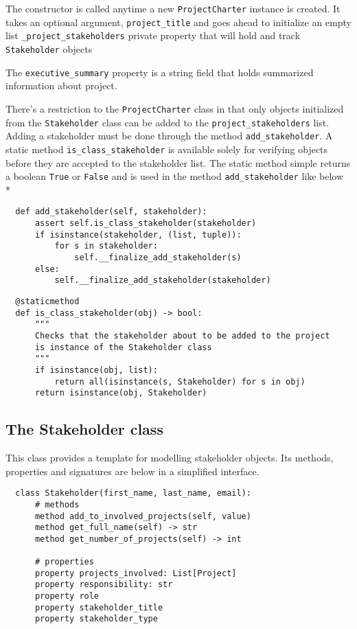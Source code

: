The constructor is called anytime a new \verb+ProjectCharter+ instance is created. It takes an optional argument, \verb+project_title+ and goes ahead to initialize an empty list \verb+_project_stakeholders+ private property that will hold and track \verb+Stakeholder+ objects

The \verb+executive_summary+ property is a string field that holds summarized information about project.

There's a restriction to the \verb+ProjectCharter+ class in that only objects initialized from the \verb+Stakeholder+ class can be added to the \verb+project_stakeholders+ list. \linebreak Adding a stakeholder must be done through the method \verb+add_stakeholder+. A static method \verb+is_class_stakeholder+ is available solely for verifying objects before they are accepted to the stakeholder list. The static method simple returns a boolean \verb+True+ or \verb+False+ and is used in the method \verb+add_stakeholder+ like below\\*

\begin{lstlisting}
  def add_stakeholder(self, stakeholder):
      assert self.is_class_stakeholder(stakeholder)
      if isinstance(stakeholder, (list, tuple)):
          for s in stakeholder:
              self.__finalize_add_stakeholder(s)
      else:
          self.__finalize_add_stakeholder(stakeholder)
\end{lstlisting}

\vfill

\begin{lstlisting}
  @staticmethod
  def is_class_stakeholder(obj) -> bool:
      """
      Checks that the stakeholder about to be added to the project
      is instance of the Stakeholder class
      """
      if isinstance(obj, list):
          return all(isinstance(s, Stakeholder) for s in obj)
      return isinstance(obj, Stakeholder)
\end{lstlisting}


\subsection{The Stakeholder class}
This class provides a template for modelling stakeholder objects. Its methods, properties and signatures are below in a simplified interface.

\begin{lstlisting}
  class Stakeholder(first_name, last_name, email):
      # methods
      method add_to_involved_projects(self, value)
      method get_full_name(self) -> str
      method get_number_of_projects(self) -> int

      # properties
      property projects_involved: List[Project]
      property responsibility: str
      property role
      property stakeholder_title
      property stakeholder_type
\end{lstlisting}


